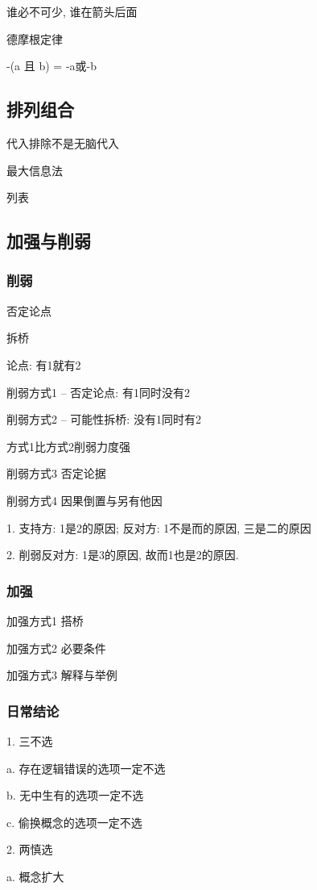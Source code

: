 \documentclass[UTF8]{ctexart}
\begin{document}
谁必不可少, 谁在箭头后面

德摩根定律

-(a 且 b) = -a或-b

\subsection{排列组合}

代入排除不是无脑代入


最大信息法

列表

\subsection{加强与削弱}

\subsubsection{削弱}
否定论点

拆桥

论点: 有1就有2

削弱方式1 -- 否定论点: 有1同时没有2

削弱方式2 -- 可能性拆桥: 没有1同时有2

方式1比方式2削弱力度强

削弱方式3 否定论据

削弱方式4  因果倒置与另有他因

1. 支持方: 1是2的原因; 反对方: 1不是而的原因, 三是二的原因

2. 削弱反对方: 1是3的原因, 故而1也是2的原因.

\subsubsection{加强}

加强方式1  搭桥

加强方式2 必要条件

加强方式3 解释与举例

\subsubsection{日常结论}
1. 三不选

a. 存在逻辑错误的选项一定不选

b. 无中生有的选项一定不选

c. 偷换概念的选项一定不选

2. 两慎选

a. 概念扩大
\end{document}
